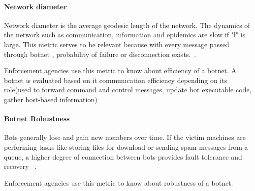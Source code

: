 \paragraph{ Network diameter }

Network diameter is the average geodesic length of the network.  The dynamics of the network such as communication, information and epidemics are slow if "l" is large. This metric serves to be relevant  because  with every message passed through botnet , probability of failure or disconnection exists.~\cite{Strayer08botnetdetection}.

Enforcement agencies use this metric to know about efficiency of a botnet. A botnet is evaluated based on it communication efficiency depending on its role(used to forward command and control messages, update bot executable code, gather host-based information)

\paragraph{ Botnet Robustness }

Bots generally lose and gain new members over time. If the victim machines are performing  tasks like storing files for download or sending spam messages from a queue, a higher degree of connection  between bots provides fault tolerance and  recovery ~\cite{Strayer08botnetdetection}.

Enforcement agencies use this metric to know about robustness of a botnet.

